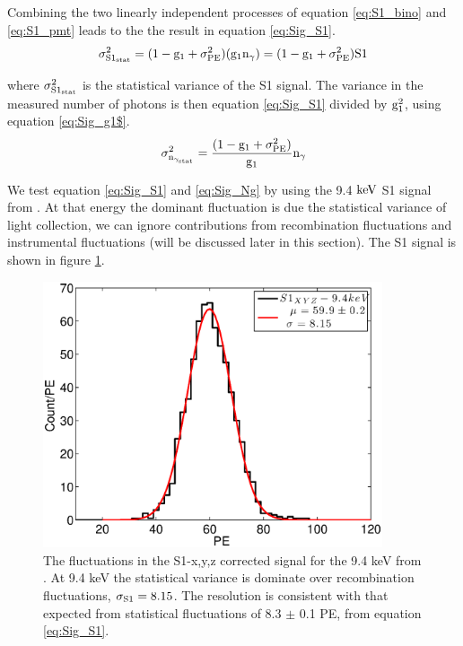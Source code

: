 Combining the two linearly independent processes of equation \ref{eq:S1_bino} and \ref{eq:S1_pmt} leads to the the result in equation \ref{eq:Sig_S1}.
\begin{equation}
\rm  \sigma_{S1_{stat}}^2 = (1-g_1+\sigma_{PE}^2) (g_1 n_\gamma) = (1-g_1+\sigma_{PE}^2) S1 \\ 
\label{eq:Sig_S1}
\end{equation}

\noindent where $\rm \sigma_{S1_{stat}}^2 $ is the statistical variance of the S1 signal. The variance in the measured number of photons is then equation \ref{eq:Sig_S1} divided by $\rm g_1^2$, using equation \ref{eq:Sig_g1$}.
\begin{equation}
\rm  \sigma_{n_{\gamma_{stat}}}^2 = \frac{(1-g_1+\sigma_{PE}^2)}{g_1} n_\gamma \\ 
\label{eq:Sig_Ng}
\end{equation}

We test equation \ref{eq:Sig_S1} and \ref{eq:Sig_Ng} by using the 9.4 $\rm keV$ S1 signal from \KrCal. At that energy the dominant fluctuation is due the statistical variance of light collection, we can ignore contributions from recombination fluctuations and instrumental fluctuations (will be discussed later in this section). The S1 signal is shown in figure \ref{fig:S1_9_Kr}.

\begin{figure}[h!]\centering
\includegraphics[width=100mm]{Chapter_Flucs//Figures/S1_9_Fluc/S1_9_corr_1000_lux10_20130510T1250_cp09323.eps}
\caption{The fluctuations in the S1-x,y,z corrected signal for the 9.4 keV from \KrCal. At 9.4 keV the statistical variance is dominate over recombination fluctuations, $\rm \sigma_{S1}=8.15$. The resolution is consistent with that expected from statistical fluctuations of 8.3 $\pm$ 0.1 PE, from equation \ref{eq:Sig_S1}. }
\label{fig:S1_9_Kr}
\end{figure}

